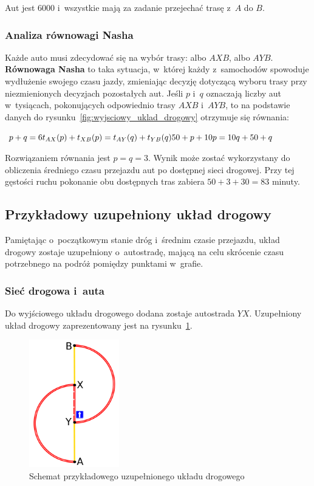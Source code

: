 \documentclass[twoside,12pt]{report}
\begin{document}
Aut jest 6000 i~wszystkie mają za zadanie przejechać trasę z~$A$ do $B$.

\subsubsection{Analiza równowagi Nasha}
Każde auto musi zdecydować się na wybór trasy: albo $AXB$, albo $AYB$. \textbf{Równowaga Nasha} to taka sytuacja, w~której każdy z~samochodów spowoduje wydłużenie swojego czasu jazdy, zmieniając decyzję dotyczącą wyboru trasy przy niezmienionych decyzjach pozostałych aut. Jeśli $p$ i~$q$ oznaczają liczby aut w~tysiącach, pokonujących odpowiednio trasy $AXB$ i~$AYB$, to na podstawie danych do rysunku~\ref{fig:wyjsciowy_uklad_drogowy} otrzymuje się równania:

\begin{center}
\begin{math}\label{eq:nash1}
p+q = 6 \newline
t_{AX}(p)+t_{XB}(p) = t_{AY}(q) + t_{YB}(q) \newline
50+p+10p = 10q+50+q \newline
\end{math}
\end{center}

Rozwiązaniem równania jest $p=q=3$. Wynik może zostać wykorzystany do obliczenia średniego czasu przejazdu aut po dostępnej sieci drogowej. Przy tej gęstości ruchu pokonanie obu dostępnych tras zabiera $50+3+30=83$ minuty.

\subsection{Przykładowy uzupełniony układ drogowy}
Pamiętając o~początkowym stanie dróg i~średnim czasie przejazdu, układ drogowy zostaje uzupełniony o~autostradę, mającą na celu skrócenie czasu potrzebnego na podróż pomiędzy punktami w~grafie.

\subsubsection{Sieć drogowa i~auta}
Do wyjściowego układu drogowego dodana zostaje autostrada $YX$. Uzupełniony układ drogowy zaprezentowany jest na rysunku~\ref{fig:wyjsciowy_uklad_drogowy2}.

\begin{figure}[htbp]
	\centering
	\includegraphics[width=0.35\textwidth]{img/braess2}
	\caption{Schemat przykładowego uzupełnionego układu drogowego}
	\label{fig:wyjsciowy_uklad_drogowy2}
\end{figure}
\end{document}
